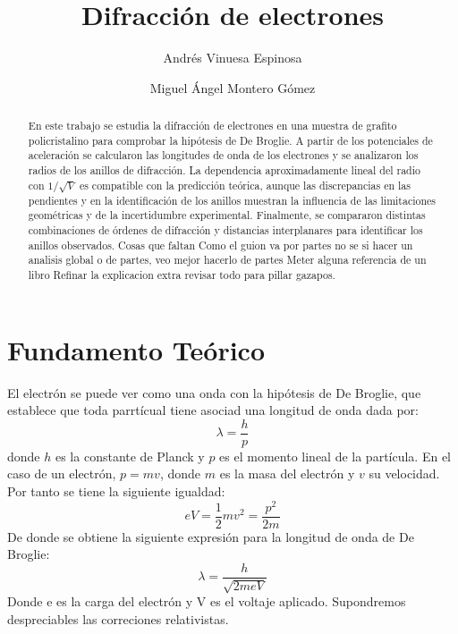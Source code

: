 \documentclass[a4paper,11pt]{article}
\begin{document}
\title{Difracción de electrones}
\author{Andrés Vinuesa Espinosa \and Miguel Ángel Montero Gómez}
\maketitle

\begin{abstract}
En este trabajo se estudia la difracción de electrones en una muestra de
grafito policristalino para comprobar la hipótesis de De Broglie. A partir de
los potenciales de aceleración se calcularon las longitudes de onda de los
electrones y se analizaron los radios de los anillos de difracción. La
dependencia aproximadamente lineal del radio con $1/\sqrt{V}$ es compatible
con la predicción teórica, aunque las discrepancias en las pendientes y en
la identificación de los anillos muestran la influencia de las limitaciones
geométricas y de la incertidumbre experimental. Finalmente, se compararon
distintas combinaciones de órdenes de difracción y distancias interplanares
para identificar los anillos observados.
Cosas que faltan
Como el guion va por partes no se si hacer un analisis global o de partes, veo mejor hacerlo de partes
Meter alguna referencia de un libro
Refinar la explicacion extra
revisar todo para pillar gazapos.
\end{abstract}

\section{Fundamento Teórico}
El electrón se puede ver como una onda con la hipótesis de De Broglie, que establece que toda parrtícual tiene asociad una longitud de onda dada por:
\begin{equation}
\lambda = \frac{h}{p}
\end{equation}
donde $h$ es la constante de Planck y $p$ es el momento lineal de la partícula. En el caso de un electrón, $p = mv$, donde $m$ es la masa del electrón y $v$ su velocidad.
Por tanto se tiene la siguiente igualdad:
\begin{equation}
    eV=\frac{1}{2}mv^2=\frac{p^2}{2m}
\end{equation}
De donde se obtiene la siguiente expresión para la longitud de onda de De Broglie:
\begin{equation}
    \lambda = \frac{h}{\sqrt{2meV}}
\end{equation}
Donde e es la carga del electrón y V es el voltaje aplicado. Supondremos despreciables las correciones relativistas.
\end{document}
